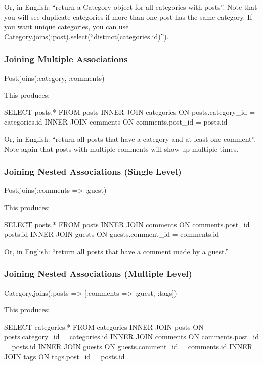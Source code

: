\documentclass[10pt]{book}
\newenvironment{code}{%
  \scriptsize
    \verbatim
}{%
    \endverbatim
    \newline
}
\begin{document}
Or, in English: “return a Category object for all categories with  posts”. Note that you will see duplicate categories if more than one  post has the same category. If you want unique categories, you can use  Category.joins(:post).select(“distinct(categories.id)”).

\subsubsection{ Joining Multiple Associations}
\begin{code}
Post.joins(:category, :comments)
\end{code}

This produces:
\begin{code}
SELECT posts.* FROM posts
  INNER JOIN categories ON posts.category_id = categories.id
  INNER JOIN comments ON comments.post_id = posts.id
\end{code}

Or, in English: “return all posts that have a category and at least  one comment”. Note again that posts with multiple comments will show up  multiple times.

\subsubsection{ Joining Nested Associations (Single Level)}
\begin{code}
Post.joins(:comments => :guest)
\end{code}

This produces:
\begin{code}
SELECT posts.* FROM posts
  INNER JOIN comments ON comments.post_id = posts.id
  INNER JOIN guests ON guests.comment_id = comments.id
\end{code}

Or, in English: “return all posts that have a comment made by a guest.”

\subsubsection{ Joining Nested Associations (Multiple Level)}
\begin{code}
Category.joins(:posts => [{:comments => :guest}, :tags])
\end{code}

This produces:
\begin{code}
SELECT categories.* FROM categories
  INNER JOIN posts ON posts.category_id = categories.id
  INNER JOIN comments ON comments.post_id = posts.id
  INNER JOIN guests ON guests.comment_id = comments.id
  INNER JOIN tags ON tags.post_id = posts.id
\end{code}
\end{document}
